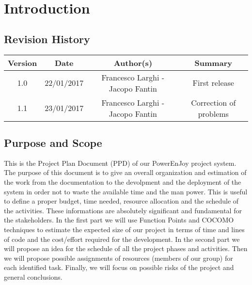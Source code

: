 \chapter{Introduction}

\section{Revision History}

\begin{table}[htbp]
\begin{center}
\begin{tabular}[t]{cccc}

\hline
Version & Date & Author(s) & Summary\\
\hline
1.0 & 22/01/2017 & Francesco Larghi - Jacopo Fantin & First release\\
\hline
1.1 & 23/01/2017 & Francesco Larghi - Jacopo Fantin & Correction of problems\\
\hline

\end{tabular}
\end{center}
\end{table}

\section{Purpose and Scope}

This is the Project Plan Document (PPD) of our PowerEnJoy project system. 
\newline
The purpose of this document is to give an overall organization and estimation of the work from the documentation to the devolpment and the deployment of the system in order not to waste the available time and the man power.
This is useful to define a proper budget, time needed, resource allocation and the schedule of the activities.
These informations are absolutely significant and fundamental for the stakeholders.
\newline
In the first part we will use Function Points and COCOMO techniques to estimate the expected size of our project in terms of time and lines of code and the cost/effort required for the development.
\newline
In the second part we will propose an idea for the schedule of all the project phases and activities.
\newline
Then we will propose possible assignments of resources (members of our group) for each identified task.
Finally, we will focus on possible risks of the project and general conclusions.


